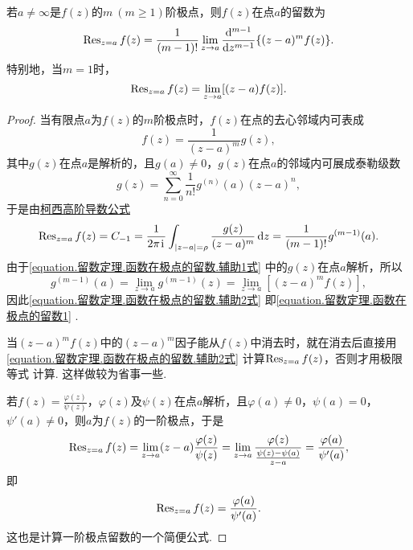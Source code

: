 \begin{property}
若\(a\neq\infty\)是\(f(z)\)的\(m\ (m\geqslant1)\)阶极点，则\(f(z)\)在点\(a\)的留数为\begin{equation}\label{equation.留数定理.函数在极点的留数1}
\operatorname{Res}_{z=a} f(z)
= \frac{1}{(m-1)!} \lim\limits_{z \to a} \dv[m-1]{z} \{ (z-a)^m f(z) \}.
\end{equation}
特别地，当\(m=1\)时，\begin{equation}\label{equation.留数定理.函数在极点的留数2}
\operatorname{Res}_{z=a} f(z)
= \lim\limits_{z \to a} [(z-a) f(z)].
\end{equation}
\begin{proof}
当有限点\(a\)为\(f(z)\)的\(m\)阶极点时，\(f(z)\)在点的去心邻域内可表成\begin{equation}\label{equation.留数定理.函数在极点的留数.辅助1式}
f(z) = \frac{1}{(z-a)^m} g(z),
\end{equation}
其中\(g(z)\)在点\(a\)是解析的，且\(g(a)\neq0\)，\(g(z)\)在点\(a\)的邻域内可展成泰勒级数\[
g(z) = \sum\limits_{n=0}^{\infty} \frac{1}{n!} g^{(n)}(a) (z-a)^n,
\]于是由\hyperref[equation:解析函数的积分表示.柯西高阶导数公式]{柯西高阶导数公式}\begin{equation}\label{equation.留数定理.函数在极点的留数.辅助2式}
\operatorname{Res}_{z=a} f(z) = C_{-1}
= \frac{1}{2\pi\kern1pt\mathrm{i}\kern1pt} \int_{\abs{z-a}=\rho} \frac{g(z)}{(z-a)^m} \dd{z}
= \frac{1}{(m-1)!} g^{(m-1)}(a).
\end{equation}由于\cref{equation.留数定理.函数在极点的留数.辅助1式} 中的\(g(z)\)在点\(a\)解析，所以\[
g^{(m-1)}(a) = \lim\limits_{z \to a} g^{(m-1)}(z)
= \lim\limits_{z \to a} [(z-a)^m f(z)],
\]因此\cref{equation.留数定理.函数在极点的留数.辅助2式} 即\cref{equation.留数定理.函数在极点的留数1} .

当\((z-a)^m f(z)\)中的\((z-a)^m\)因子能从\(f(z)\)中消去时，就在消去后直接用\cref{equation.留数定理.函数在极点的留数.辅助2式} 计算\(\operatorname{Res}_{z=a} f(z)\)，否则才用极限等式 计算.
这样做较为省事一些.

若\(f(z) = \frac{\varphi(z)}{\psi(z)}\)，\(\varphi(z)\)及\(\psi(z)\)在点\(a\)解析，且\(\varphi(a)\neq0\)，\(\psi(a)=0\)，\(\psi'(a)\neq0\)，则\(a\)为\(f(z)\)的一阶极点，于是\[
\operatorname{Res}_{z=a} f(z)
= \lim\limits_{z \to a} (z-a) \frac{\varphi(z)}{\psi(z)}
= \lim\limits_{z \to a} \frac{\varphi(z)}{\frac{\psi(z)-\psi(a)}{z-a}}
= \frac{\varphi(a)}{\psi'(a)},
\]即\begin{equation}\label{equation.留数定理.函数在极点的留数3}
\operatorname{Res}_{z=a} f(z)
= \frac{\varphi(a)}{\psi'(a)}.
\end{equation}
这也是计算一阶极点留数的一个简便公式.
\end{proof}
\end{property}

